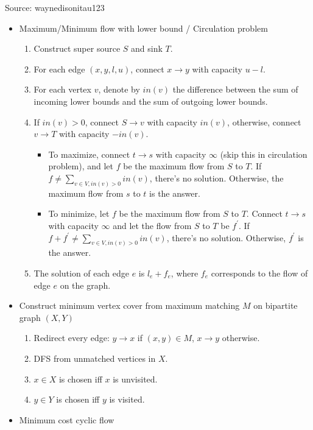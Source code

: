 Source: waynedisonitau123

\begin{itemize}
    \item Maximum/Minimum flow with lower bound / Circulation problem
    \begin{enumerate}
        \item Construct super source $S$ and sink $T$.
        \item For each edge $(x, y, l, u)$, connect $x \rightarrow y$ with capacity $u - l$.
        \item For each vertex $v$, denote by $in(v)$ the difference between the sum of incoming lower bounds and the sum of outgoing lower bounds.
        \item If $in(v) > 0$, connect $S \rightarrow v$ with capacity $in(v)$, otherwise, connect $v \rightarrow T$ with capacity $-in(v)$.
        \begin{itemize}
            \item To maximize, connect $t \rightarrow s$ with capacity $\infty$ (skip this in circulation problem), and let $f$ be the maximum flow from $S$ to $T$. If $f \neq \sum_{v \in V, in(v) > 0}{in(v)}$, there's no solution. Otherwise, the maximum flow from $s$ to $t$ is the answer.
            \item To minimize, let $f$ be the maximum flow from $S$ to $T$. Connect $t \rightarrow s$ with capacity $\infty$ and let the flow from $S$ to $T$ be $f^\prime$. If $f + f^\prime \neq \sum_{v \in V, in(v) > 0}{in(v)}$, there's no solution. Otherwise, $f^\prime$ is the answer.
        \end{itemize}
        \item The solution of each edge $e$ is $l_e + f_e$, where $f_e$ corresponds to the flow of edge $e$ on the graph.
    \end{enumerate}
    \item Construct minimum vertex cover from maximum matching $M$ on bipartite graph $(X, Y)$
    \begin{enumerate}
        \item Redirect every edge: $y \rightarrow x$ if $(x, y) \in M$, $x \rightarrow y$ otherwise.
        \item DFS from unmatched vertices in $X$.
        \item $x \in X$ is chosen iff $x$ is unvisited.
        \item $y \in Y$ is chosen iff $y$ is visited.
    \end{enumerate}
    \item Minimum cost cyclic flow

\end{itemize}
